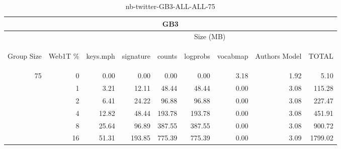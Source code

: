 \begin{center}
\begin{table}[htbp]
\begin{tabular}{ | r | r | r | r | r | r | r | r | r |}
\hline
\multicolumn{9}{|c|}{GB3}\\
\hline
 & & \multicolumn{7}{|c|}{Size (MB)}\\ \cline{3-9}
\begin{sideways}Group Size\end{sideways} & \begin{sideways}Web1T \% \end{sideways} & \begin{sideways}keys.mph\end{sideways} & \begin{sideways}signature\end{sideways} & \begin{sideways}counts\end{sideways} & \begin{sideways}logprobs\end{sideways} & \begin{sideways}vocabmap\end{sideways} & \begin{sideways}Authors Model \end{sideways} & \begin{sideways}TOTAL\end{sideways}\\
\hline
\multirow{5}{*}{75}
 & 0 & 0.00 & 0.00 & 0.00 & 0.00 & 3.18 & 1.92 & 5.10\\ \cline{2-9}
 & 1 & 3.21 & 12.11 & 48.44 & 48.44 & 0.00 & 3.08 & 115.28\\ \cline{2-9}
 & 2 & 6.41 & 24.22 & 96.88 & 96.88 & 0.00 & 3.08 & 227.47\\ \cline{2-9}
 & 4 & 12.82 & 48.44 & 193.78 & 193.78 & 0.00 & 3.08 & 451.91\\ \cline{2-9}
 & 8 & 25.64 & 96.89 & 387.55 & 387.55 & 0.00 & 3.08 & 900.72\\ \cline{2-9}
 & 16 & 51.31 & 193.85 & 775.39 & 775.39 & 0.00 & 3.09 & 1799.02\\ \cline{2-9}
\hline
\end{tabular}
\caption{nb-twitter-GB3-ALL-ALL-75}
\label{table:nb-twitter-GB3-ALL-ALL-75}
\end{table}
\end{center}

